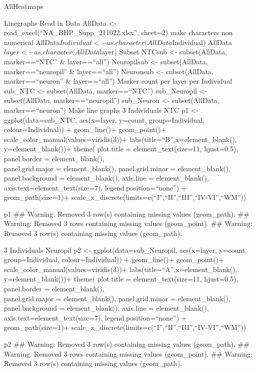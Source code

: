 \documentclass[
]{article}
\begin{document}
AllHeatmaps

Linegraphs Read in Data AllData \textless-
read\_excel(``NA\_BHP\_Supp\_211022.xlsx'', sheet=2) make characters non
numerical AllData\(Individual<-as.character(AllData\)Individual)
AllData\(layer<-as.character(AllData\)layer) Subset NTCsub \textless-
subset(AllData, marker==``NTC'' \& layer==``all'') Neuropilsub
\textless- subset(AllData, marker==``neuropil'' \& layer==``all'')
Neuronsub \textless- subset(AllData, marker==``neuron'' \&
layer==``all'') Marker count per layer per Individual sub\_NTC
\textless- subset(AllData, marker==``NTC'') sub\_Neuropil \textless-
subset(AllData, marker==``neuropil'') sub\_Neuron \textless-
subset(AllData, marker==``neuron'') Make line graphs 3 Individuals NTC
p1 \textless- ggplot(data=sub\_NTC, aes(x=layer, y=count,
group=Individual, colour=Individual)) + geom\_line()+ geom\_point()+
scale\_color\_manual(values=viridis(3))+
labs(title=``B'',x=element\_blank(), y=element\_blank())+ theme(
plot.title = element\_text(size=11, hjust=0.5), panel.border =
element\_blank(),\\
panel.grid.major = element\_blank(), panel.grid.minor =
element\_blank(), panel.background = element\_blank(), axis.line =
element\_blank(), axis.text=element\_text(size=7),
legend.position=``none'') + geom\_path(size=1)+
scale\_x\_discrete(limits=c(``I'',``II'',``III'',``IV-VI'',``WM''))

p1 \#\# Warning: Removed 3 row(s) containing missing values
(geom\_path). \#\# Warning: Removed 3 rows containing missing values
(geom\_point). \#\# Warning: Removed 3 row(s) containing missing values
(geom\_path).

3 Individuals Neuropil p2 \textless- ggplot(data=sub\_Neuropil,
aes(x=layer, y=count, group=Individual, colour=Individual)) +
geom\_line()+ geom\_point()+ scale\_color\_manual(values=viridis(3))+
labs(title=``A'',x=element\_blank(), y=element\_blank())+ theme(
plot.title = element\_text(size=11, hjust=0.5), panel.border =
element\_blank(),\\
panel.grid.major = element\_blank(), panel.grid.minor =
element\_blank(), panel.background = element\_blank(), axis.line =
element\_blank(), axis.text=element\_text(size=7),
legend.position=``none'') + geom\_path(size=1)+
scale\_x\_discrete(limits=c(``I'',``II'',``III'',``IV-VI'',``WM''))

p2 \#\# Warning: Removed 3 row(s) containing missing values
(geom\_path). \#\# Warning: Removed 3 rows containing missing values
(geom\_point). \#\# Warning: Removed 3 row(s) containing missing values
(geom\_path).
\end{document}
